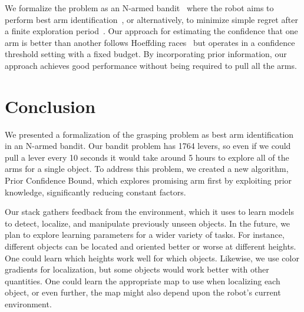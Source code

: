 \documentclass{article}
\newcommand{\stnote}[1]{\textcolor{blue}{\textbf{ST: #1}}}
\newcommand{\algorithmDTxt}{Prior Confidence Bound\xspace}
\begin{document}
We formalize the problem as an N-armed bandit~\citep{thompson33} where
the robot aims to perform best arm identification~\citep{audibert10,
  chen14}, or alternatively, to minimize simple regret after a finite
exploration period~\citep{bubeck09}.  Our approach for estimating the
confidence that one arm is better than another follows Hoeffding
races~\citep{maron93} but operates in a confidence threshold setting
with a fixed budget.  By incorporating prior information, our approach
achieves good performance without being required to pull all the arms.


\section{Conclusion}

\label{sec:conclusion}


We presented a formalization of the grasping problem as best arm
identification in an N-armed bandit.  Our bandit problem has 1764
levers, so even if we could pull a lever every 10 seconds it would
take around 5 hours to explore all of the arms for a single object.
To address this problem, we created a new algorithm, \algorithmDTxt,
which explores promising arm first by exploiting prior knowledge,
significantly reducing constant factors. 

Our stack gathers feedback from the environment, which it uses to
learn models to detect, localize, and manipulate previously unseen
objects. In the future, we plan to explore learning parameters for a
wider variety of tasks.  For instance, different objects can be
located and oriented better or worse at different heights. One could
learn which heights work well for which objects.  Likewise, we use
color gradients for localization, but some objects would work better
with other quantities. One could learn the appropriate map to use when
localizing each object, or even further, the map might also depend
upon the robot's current environment.

\end{document}
